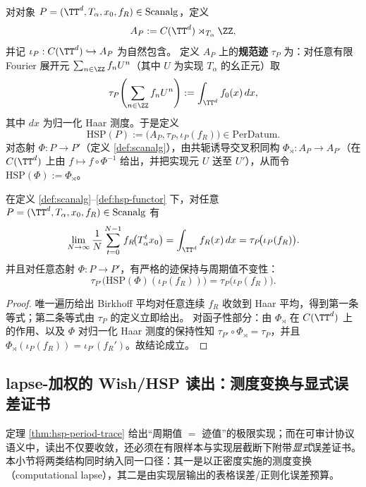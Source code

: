 \begin{definition}\label{def:hsp-functor}
对对象 \(P=(\TT^d,T_\alpha,x_0,f_R)\in\mathrm{Scanalg}\)，定义
\[
A_P:=C(\TT^d)\rtimes_{T_\alpha}\ZZ,
\]
并记 \(\iota_P:C(\TT^d)\hookrightarrow A_P\) 为自然包含。
定义 \(A_P\) 上的\textbf{规范迹} \(\tau_P\) 为：对任意有限 Fourier 展开元
\(
\sum_{n\in\ZZ} f_n U^n
\)（其中 \(U\) 为实现 \(T_\alpha\) 的幺正元）取
\[
\tau_P\!\left(\sum_{n\in\ZZ} f_n U^n\right):=\int_{\TT^d} f_0(x)\,dx,
\]
其中 \(dx\) 为归一化 Haar 测度。于是定义
\[
\mathrm{HSP}(P):=\bigl(A_P,\tau_P,\iota_P(f_R)\bigr)\in\mathrm{PerDatum}.
\]
对态射 \(\Phi:P\to P'\)（定义 \ref{def:scanalg}），由共轭诱导交叉积同构 \(\Phi_\rtimes:A_P\to A_{P'}\)（在 \(C(\TT^d)\) 上由 \(f\mapsto f\circ\Phi^{-1}\) 给出，并把实现元 \(U\) 送至 \(U'\)），从而令 \(\mathrm{HSP}(\Phi):=\Phi_\rtimes\)。
\end{definition}

\begin{theorem}[“周期值 \(=\) 迹值”：唯一遍历 Birkhoff 平均的非交换表述]\label{thm:hsp-period-trace}
在定义 \ref{def:scanalg}--\ref{def:hsp-functor} 下，对任意 \(P=(\TT^d,T_\alpha,x_0,f_R)\in\mathrm{Scanalg}\) 有
\[
\lim_{N\to\infty}\frac{1}{N}\sum_{t=0}^{N-1} f_R\!\bigl(T_\alpha^t x_0\bigr)
=\int_{\TT^d} f_R(x)\,dx
=\tau_P\!\bigl(\iota_P(f_R)\bigr).
\]
并且对任意态射 \(\Phi:P\to P'\)，有严格的迹保持与周期值不变性：
\[
\tau_{P'}\!\bigl(\mathrm{HSP}(\Phi)(\iota_P(f_R))\bigr)=\tau_P\!\bigl(\iota_P(f_R)\bigr).
\]
\end{theorem}

\begin{proof}
唯一遍历给出 Birkhoff 平均对任意连续 \(f_R\) 收敛到 Haar 平均，得到第一条等式；第二条等式由 \(\tau_P\) 的定义立即给出。
对函子性部分：由 \(\Phi_\rtimes\) 在 \(C(\TT^d)\) 上的作用、以及 \(\Phi\) 对归一化 Haar 测度的保持性知 \(\tau_{P'}\circ \Phi_\rtimes=\tau_P\)，并且 \(\Phi_\rtimes(\iota_P(f_R))=\iota_{P'}(f_R')\)。故结论成立。
\end{proof}

\subsection{lapse-加权的 Wish/HSP 读出：测度变换与显式误差证书}\label{app:op-algebra-wish-lapse}
定理 \ref{thm:hsp-period-trace} 给出“周期值 \(=\) 迹值”的极限实现；而在可审计协议语义中，读出不仅要收敛，还必须在有限样本与实现层截断下附带\emph{显式}误差证书。
本小节将两类结构同时纳入同一口径：其一是以正密度实施的测度变换（computational lapse），其二是由实现层输出的表格误差/正则化误差预算。

